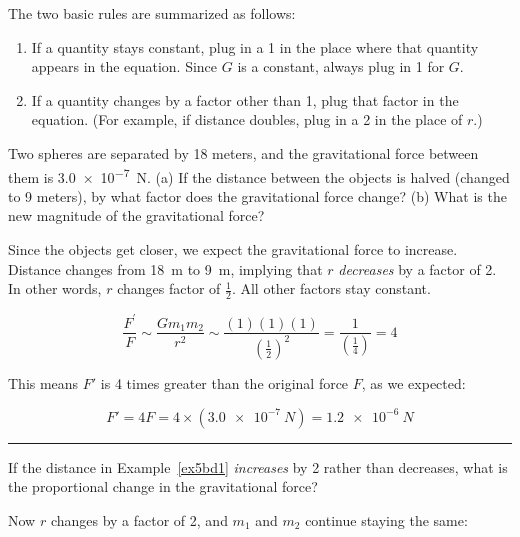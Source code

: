 \documentclass[main-physics.tex]{subfiles}
\begin{document}
The two basic rules are summarized as follows:

\begin{enumerate}
\setlength\itemsep{0ex}
    \item If a quantity stays constant, plug in a 1 in the place where that quantity appears in the equation. Since $G$ is a constant, always plug in 1 for $G$.
    \item If a quantity changes by a factor other than 1, plug that factor in the equation. (For example, if distance doubles, plug in a 2 in the place of $r$.)
\end{enumerate}



\begin{example} \label{ex5bd1}
Two spheres are separated by 18 meters, and the gravitational force between them is \SI{3.0e-7}{N}. (a) If the distance between the objects is halved (changed to 9 meters), by what factor does the gravitational force change? (b) What is the new magnitude of the gravitational force?
\end{example}

\Solution Since the objects get closer, we expect the gravitational force to increase. Distance changes from \SI{18}{m} to \SI{9}{m}, implying that $r$ \textit{decreases} by a factor of 2. In other words, $r$ changes factor of $\frac{1}{2}$. All other factors stay constant. 

\begin{equation*}
    \frac{F^{\prime}}{F} \sim \frac{G m_1 m_2}{r^2} \sim \frac{(1)(1)(1)}{\left(\frac{1}{2}\right)^2} = \frac{1}{\left(\frac{1}{4}\right)} = 4
\end{equation*}

This means $F'$ is 4 times greater than the original force $F$, as we expected:

\begin{equation*}
    F' = 4 F = 4 \times  \left(\SI{3.0e-7}{N}\right) = \SI{1.2e-6}{N}
\end{equation*}


\vspace{1em}
\hrule

\begin{example}
If the distance in Example~\ref{ex5bd1} \textit{increases} by 2 rather than decreases, what is the proportional change in the gravitational force?
\end{example} 

\Solution Now $r$ changes by a factor of 2, and $m_1$ and $m_2$ continue staying the same:
\end{document}
